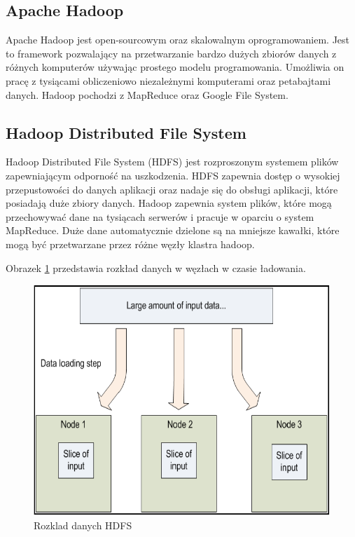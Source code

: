 \documentclass[twocolumn]{svjour3}          %
\begin{document}
\subsection{Apache Hadoop}
\label{ssub:apache_hadoop}
Apache Hadoop jest open-sourcowym oraz skalowalnym oprogramowaniem. Jest to framework pozwalający na przetwarzanie bardzo dużych zbiorów danych z różnych komputerów używając prostego modelu programowania. Umożliwia on pracę z tysiącami obliczeniowo niezależnymi komputerami oraz petabajtami danych. Hadoop pochodzi z MapReduce oraz Google File System.

\subsection{Hadoop Distributed File System}
\label{ssub:hdfs}
Hadoop Distributed File System (HDFS) jest rozproszonym systemem plików zapewniającym odporność na uszkodzenia. HDFS zapewnia dostęp o wysokiej przepustowości do danych aplikacji oraz nadaje się do obsługi aplikacji, które posiadają duże zbiory danych. Hadoop zapewnia system plików, które mogą przechowywać dane na tysiącach serwerów i pracuje w oparciu o system MapReduce. Duże dane automatycznie dzielone są na mniejsze kawałki, które mogą być przetwarzane przez różne węzły klastra hadoop.

Obrazek \ref{fig:rozklad_danych} przedstawia rozkład danych w węzłach w czasie ładowania.


\begin{figure}
    \centerline{\includegraphics[scale=0.3]{obrazki/rozklad_danych.png}}
    \caption{Rozklad danych HDFS}
    \label{fig:rozklad_danych}       %
\end{figure}
\end{document}
